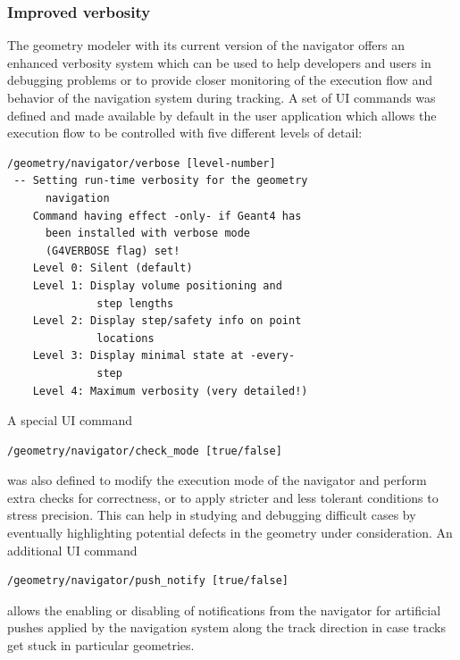 \subsubsection{Improved verbosity}
The geometry modeler with its current version of the navigator offers an 
enhanced verbosity system which can be used to help developers and users in 
debugging problems or to provide closer monitoring of the execution flow and 
behavior of the navigation system during tracking.  A set of UI commands was 
defined and made available by default in the user application which allows the 
execution flow to be controlled with five different levels of detail:
\begin{verbatim}
/geometry/navigator/verbose [level-number]
 -- Setting run-time verbosity for the geometry
      navigation
    Command having effect -only- if Geant4 has
      been installed with verbose mode
      (G4VERBOSE flag) set!
    Level 0: Silent (default)
    Level 1: Display volume positioning and 
              step lengths
    Level 2: Display step/safety info on point
              locations
    Level 3: Display minimal state at -every-
              step
    Level 4: Maximum verbosity (very detailed!)
\end{verbatim}
A special UI command 
\begin{verbatim}
/geometry/navigator/check_mode [true/false]
\end{verbatim}
was also defined to modify the execution mode of the navigator and perform extra
checks for correctness, or to apply stricter and less tolerant conditions to 
stress precision.  This can help in studying and debugging difficult cases by 
eventually highlighting potential defects in the geometry under consideration.
An additional UI command
\begin{verbatim}
/geometry/navigator/push_notify [true/false]
\end{verbatim}
allows the enabling or disabling of notifications from the navigator for 
artificial pushes applied by the navigation system along the track direction in
case tracks get stuck in particular geometries.


